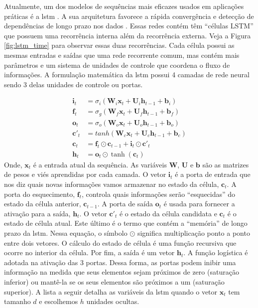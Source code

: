 Atualmente, um dos modelos de sequências mais eficazes usados em aplicações práticas é a \gls{lstm} \cite{lstm}. A sua arquitetura favorece a rápida convergência e detecção de dependências de longo prazo nos dados \cite{geron2017hands}.
Essas redes contém  têm ``células LSTM'' que possuem uma recorrência interna além da recorrência externa. Veja a Figura \ref{fig:lstm_time} para observar essas duas recorrências. Cada célula possui as mesmas entradas e saídas que uma rede recorrente comum, mas contém mais parâmetros e um sistema de unidades de controle que coordena o fluxo de informações.  A formulação matemática da \acrshort{lstm} possui 4 camadas de rede neural sendo 3 delas unidades de controle ou portas. 

\begin{equation}
\label{eq:lstm}
\begin{aligned}
\textbf{i}_t &= \sigma_{i}(\textbf{W}_i\textbf{x}_t + \textbf{U}_i\textbf{h}_{t-1} + \textbf{b}_i) \\
\textbf{f}_t &= \sigma_{g}(\textbf{W}_f\textbf{x}_t + \textbf{U}_f\textbf{h}_{t-1} + \textbf{b}_f) \\
\textbf{o}_t &= \sigma_{o}(\textbf{W}_o\textbf{x}_t + \textbf{U}_o\textbf{h}_{t-1} + \textbf{b}_o) \\   
\textbf{c}'_t &= tanh(\textbf{W}_c\textbf{x}_t + \textbf{U}_c\textbf{h}_{t-1} + \textbf{b}_c) \\
\textbf{c}_t &= \textbf{f}_t \odot \textbf{c}_{t-1} + \textbf{i}_t \odot \textbf{c}'_t \\
\textbf{h}_t & = \textbf{o}_t \odot \tanh(\textbf{c}_t)  
\end{aligned}
\end{equation}
Onde, $\textbf{x}_t$ é a entrada atual da sequência. As variáveis $\textbf{W}$, $\textbf{U}$ e $\textbf{b}$  são as matrizes de pesos e viés aprendidas por cada camada.  O vetor $\textbf{i}_{t}$ é a porta de entrada que nos diz quais novas informações vamos armazenar no estado da célula, $\textbf{c}_{t}$. 
A porta do esquecimento, $\textbf{f}_{t}$, controla quais informações serão ``esquecidas'' do estado da célula anterior, $\textbf{c}_{t-1}$. A porta de saída $\textbf{o}_{t}$ é usada para fornecer a ativação para a saída, $\textbf{h}_{t}$. O vetor $\textbf{c}'_{t}$ é o estado da célula candidata e $\textbf{c}_{t}$ é o estado de célula atual.  Este último é o termo que contém a ``memória'' de longo prazo da \acrshort{lstm}. Nessa equação, o símbolo $\odot$ significa multiplicação ponto a ponto entre dois vetores. O cálculo do estado de célula é uma função recursiva que ocorre no interior da célula. Por fim, a saída é um  vetor $\textbf{h}_{t}$.
A função logística é adotada na ativação das 3 portas.  Dessa forma, as portas podem inibir uma informação na medida que seus elementos sejam próximos de zero (saturação inferior) ou mantê-la se os seus elementos são próximos a um (saturação superior). A lista a seguir detalha as variáveis da \acrshort{lstm} quando o vetor $\textbf{x}_t$ tem tamanho $d$ e escolhemos $h$ unidades ocultas.    



